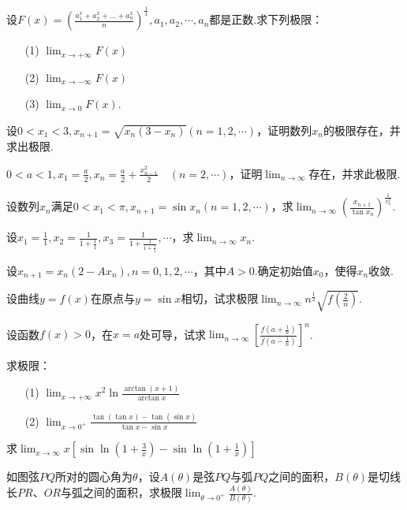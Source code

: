 \begin{xiti}
\begin{enumerate}
\end{enumerate}
\item 设$F ( x ) = \left( \frac { a _ { 1 } ^ { x } + a _ { 2 } ^ { x } + \ldots + a _ { n } ^ { x } } { n } \right) ^ { \frac { 1 } { x } } , a _ { 1 } , a _ { 2 } , \cdots , a _ { n }$都是正数.求下列极限：
\begin{enumerate}
	\item[(1)] $\lim _ { x \rightarrow + \infty } F ( x )$
	\item[(2)] $\lim _ { x \rightarrow - \infty } F ( x )$
	\item[(3)] $\lim _ { x \rightarrow 0 } F ( x )$.
\end{enumerate}
\item 设$0<x_{1}<3,x _ { n + 1 } = \sqrt { x _ { n } \left( 3 - x _ { n } \right) } ( n = 1,2 , \cdots )$，证明数列${x_{n}}$的极限存在，并求出极限.
\item $0 < a < 1 , x _ { 1 } = \frac { a } { 2 } , x _ { n } = \frac { a } { 2 } + \frac { x _ { n - 1 } ^ { 2 } } { 2 } \quad ( n = 2 , \cdots )$，证明$\lim_{ n \rightarrow \infty }$存在，并求此极限.
\item 设数列${x_{n}}$满足$0 < x _ { 1 } < \pi , x _ { n + 1 } = \sin x _ { n } ( n = 1,2 , \cdots )$，求$\lim _ { n \rightarrow \infty } \left( \frac { x _ { n + 1 } } { \tan x _ { n } } \right) ^ { \frac { 1 } { x _ { n } ^ { 2 } } }$.
\item 设$x _ { 1 } = \frac { 1 } { 1 } , x _ { 2 } = \frac { 1 } { 1 + \frac { 1 } { 1 } } , x _ { 3 } = \frac { 1 } { 1 + \frac { 1 } { 1 + \frac { 1 } { 1 } } } , \cdots$，求$\lim_{ n \rightarrow \infty }x_{n}$.
\item 设$x _ { n + 1 } = x _ { n } \left( 2 - A x _ { n } \right) , n = 0,1,2 , \cdots$，其中$A>0$.确定初始值$x_{0}$，使得${x_{n}}$收敛.
\item 设曲线$y=f(x)$在原点与$y=\sin x$相切，试求极限$\lim _ { n \rightarrow \infty } n ^ { \frac { 1 } { 2 } } \sqrt { f \left( \frac { 2 } { n } \right) }$.
\item 设函数$f(x)>0$，在$x=a$处可导，试求$\lim _ { n \rightarrow \infty } \left[ \frac { f \left( a + \frac { 1 } { n } \right) } { f \left( a - \frac { 1 } { n } \right) } \right] ^ { n }$.
\item 求极限：
\begin{enumerate}
	\item[(1)] $\lim _ { x \rightarrow + \infty } x ^ { 2 } \ln \frac { \arctan ( x + 1 ) } { \arctan x }$
	\item[(2)] $\lim _ { x \rightarrow 0 ^ {+ } } \frac { \tan ( \tan x ) - \tan ( \sin x ) } { \tan x - \sin x }$
\end{enumerate}
\item 求$\lim _ { x \rightarrow \infty } x \left[ \sin \ln \left( 1 + \frac { 3 } { x } \right) - \sin \ln \left( 1 + \frac { 1 } { x } \right) \right]$
\item 如图弦$PQ$所对的圆心角为$\theta$，设$A(\theta)$是弦$PQ$与弧$PQ$之间的面积，$B(\theta)$是切线长$PR$、$OR$与弧之间的面积，求极限$\lim _ { \theta \rightarrow 0 ^ { + } } \frac { A ( \theta ) } { B ( \theta ) }$.


\end{xiti}
